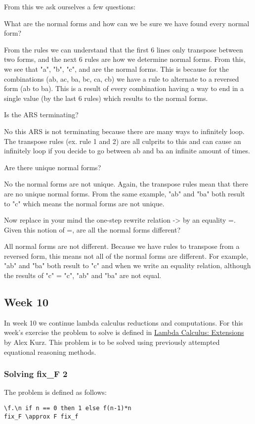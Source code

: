 \documentclass{article}
\theoremstyle{theorem}
\theoremstyle{definition}
\theoremstyle{remark}
\begin{document}
From this we ask ourselves a few questions:

\medskip
What are the normal forms and how can we be sure we have found every normal form?

\noindent From the rules we can understand that the first 6 lines only transpose between two forms, and the next 6 rules are how we determine normal forms. From this, we see that "a", "b", "c", and {} are the normal forms. This is because for the combinations (ab, ac, ba, bc, ca, cb) we have a rule to alternate to a reversed form (ab to ba). This is a result of every combination having a way to end in a single value (by the last 6 rules) which results to the normal forms.

\medskip
Is the ARS terminating?

\noindent
No this ARS is not terminating because there are many ways to infinitely loop. The transpose rules (ex. rule 1 and 2) are all culprits to this and can cause an infinitely loop if you decide to go between ab and ba an infinite amount of times.

\medskip
Are there unique normal forms?

\noindent
No the normal forms are not unique. Again, the transpose rules mean that there are no unique normal forms. From the same example, "ab" and "ba" both result to "c" which means the normal forms are not unique.

\medskip
Now replace in your mind the one-step rewrite relation -> by an equality =. Given this notion of =, are all the normal forms different?

\noindent
All normal forms are not different. Because we have rules to transpose from a reversed form, this means not all of the normal forms are different. For example, "ab" and "ba" both result to "c" and when we write an equality relation, although the results of "c" = "c", "ab" and "ba" are not equal.

\subsection{Week 10}
In week 10 we continue lambda calculus reductions and computations. For this week's exercise the problem to solve is defined in \href{https://hackmd.io/@alexhkurz/rJEeYqZtw}{Lambda Calculus: Extensions} by Alex Kurz. This problem is to be solved using previously attempted equational reasoning methods.

\subsubsection{Solving fix_F 2}
The problem is defined as follows:
\begin{lstlisting}
\f.\n if n == 0 then 1 else f(n-1)*n
fix_F \approx F fix_f
\end{lstlisting}
\end{document}
